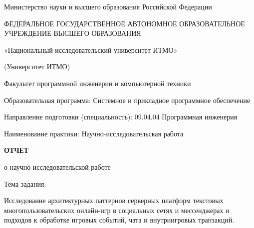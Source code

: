 \documentclass[a4paper,14pt]{extarticle}
\numberwithin{figure}{section}
\numberwithin{table}{section}
\begin{document}
\pagestyle{empty}

\begin{titlepage}
\thispagestyle{empty}
\begin{center}
    {\fontsize{14}{17}\selectfont Министерство науки и высшего образования Российской Федерации\par}
    {\fontsize{14}{17}\selectfont ФЕДЕРАЛЬНОЕ ГОСУДАРСТВЕННОЕ АВТОНОМНОЕ ОБРАЗОВАТЕЛЬНОЕ УЧРЕЖДЕНИЕ ВЫСШЕГО ОБРАЗОВАНИЯ\par}
    {\fontsize{14}{17}\selectfont «Национальный исследовательский университет ИТМО»\par}
    {\fontsize{14}{17}\selectfont (Университет ИТМО)\par}
\end{center}

\vspace{0.35cm}

\begin{center}
    {\fontsize{14}{17}\selectfont Факультет программной инженерии и компьютерной техники\par}
\end{center}

\vspace{0.35cm}

\begin{center}
    {\normalsize Образовательная программа: Системное и прикладное программное обеспечение\par}
    {\normalsize Направление подготовки (специальность): 09.04.04 Программная инженерия\par}
    {\normalsize Наименование практики: Научно-исследовательская работа\par}
\end{center}

\vspace{0.7cm}

\begin{center}
{\bfseries\fontsize{16}{19}\selectfont О\;Т\;Ч\;Е\;Т\par}
\vspace{0.25em}
{\normalsize о научно-исследовательской работе\par}
\vspace{0.45em}
{\normalsize Тема задания:\par}
\vspace{0.2em}
{\bfseries\fontsize{14}{17}\selectfont
\begin{minipage}{0.98\textwidth}
\centering
Исследование архитектурных паттернов серверных платформ текстовых многопользовательских онлайн-игр в социальных сетях и мессенджерах и подходов к обработке игровых событий, чата и внутриигровых транзакций.
\end{minipage}\par}
\end{center}


\end{titlepage}
\end{document}
